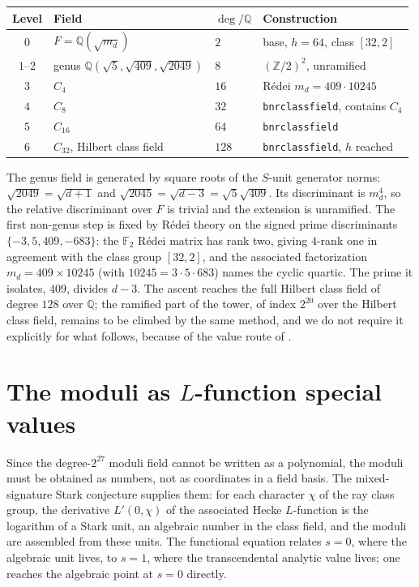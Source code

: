 \documentclass[12pt,a4paper]{article}
\newcommand{\Fd}{F}
\newcommand{\md}{m_d}
\begin{document}
\begin{center}
\begin{tabular}{@{}clll@{}}
\toprule
Level & Field & $\deg/\mathbb{Q}$ & Construction \\
\midrule
$0$ & $\Fd = \mathbb{Q}(\sqrt{\md})$ & $2$ & base, $h=64$, class $[32,2]$ \\
$1$--$2$ & genus $\mathbb{Q}(\sqrt5,\sqrt{409},\sqrt{2049})$ & $8$ & $(\mathbb{Z}/2)^2$, unramified \\
$3$ & $C_4$ & $16$ & R\'edei $\md = 409\cdot 10245$ \\
$4$ & $C_8$ & $32$ & \texttt{bnrclassfield}, contains $C_4$ \\
$5$ & $C_{16}$ & $64$ & \texttt{bnrclassfield} \\
$6$ & $C_{32}$, Hilbert class field & $128$ & \texttt{bnrclassfield}, $h$ reached \\
\bottomrule
\end{tabular}
\end{center}

The genus field is generated by square roots of the $S$-unit generator norms:
$\sqrt{2049} = \sqrt{d+1}$ and $\sqrt{2045}=\sqrt{d-3}=\sqrt{5}\sqrt{409}$.  Its
discriminant is $\md^{4}$, so the relative discriminant over $\Fd$ is trivial and
the extension is unramified.  The first non-genus step is fixed by R\'edei theory
on the signed prime discriminants $\{-3,5,409,-683\}$: the $\mathbb{F}_2$
R\'edei matrix has rank two, giving $4$-rank one in agreement with the class
group $[32,2]$, and the associated factorization $\md = 409\times 10245$ (with
$10245 = 3\cdot 5\cdot 683$) names the cyclic quartic.  The prime it isolates,
$409$, divides $d-3$.  The ascent reaches the full Hilbert class field of degree
$128$ over $\mathbb{Q}$; the ramified part of the tower, of index $2^{20}$ over
the Hilbert class field, remains to be climbed by the same method, and we do not
require it explicitly for what follows, because of the value route of
.

\section{The moduli as $L$-function special values}
\label{sec:portals}

Since the degree-$2^{27}$ moduli field cannot be written as a polynomial, the
moduli must be obtained as numbers, not as coordinates in a field basis.  The
mixed-signature Stark conjecture supplies them: for each character $\chi$ of the
ray class group, the derivative $L'(0,\chi)$ of the associated Hecke
$L$-function is the logarithm of a Stark unit, an algebraic number in the class
field, and the moduli are assembled from these units.  The functional equation
relates $s=0$, where the algebraic unit lives, to $s=1$, where the transcendental
analytic value lives; one reaches the algebraic point at $s=0$ directly.
\end{document}
